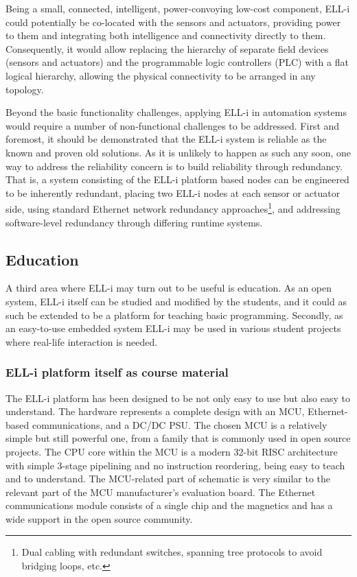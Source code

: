 \documentclass{siamltex}
\begin{document}
Being a small, connected, intelligent, power-convoying low-cost
component, ELL-i could
potentially be co-located with the sensors and actuators, providing
power to them and integrating both intelligence and connectivity
directly to them.  Consequently, it would allow replacing the
hierarchy of separate field devices (sensors and actuators) and the
programmable logic controllers (PLC) with a flat logical hierarchy,
allowing the physical connectivity to be arranged in any topology.

Beyond the basic functionality challenges, applying ELL-i in
automation systems would require a number of non-functional challenges
to be addressed.  First and foremost, it should be demonstrated that
the ELL-i system is reliable as the known and proven old solutions.
As it is unlikely to happen as such any soon, one way to address the
reliability concern is to build reliability through redundancy.  That
is, a system consisting of the ELL-i platform based nodes can be
engineered to be inherently redundant, placing two ELL-i nodes at each
sensor or actuator side, using standard Ethernet network redundancy
approaches\footnote{Dual cabling with redundant switches, spanning
  tree protocols to avoid bridging loops, etc.}, and addressing
software-level redundancy through differing runtime systems.

\subsection{Education}

A third area where ELL-i may turn out to be useful is education.  As
an open system, ELL-i itself can be studied and modified by the
students, and it could as such be extended to be a platform for teaching
basic programming.  Secondly, as an easy-to-use embedded system ELL-i
may be used in various student projects where real-life interaction is
needed.

\subsubsection{ELL-i platform itself as course material}

The ELL-i platform has been designed to be not only easy to use but
also easy to understand.  The hardware represents a complete design
with an MCU, Ethernet-based communications, and a DC/DC PSU.  The
chosen MCU is a relatively simple but still powerful one, from a
family that is commonly used in open source projects.  The CPU core
within the MCU is a modern 32-bit RISC architecture with simple
3-stage pipelining and no instruction reordering, being easy to teach
and to understand.  The MCU-related part of schematic is very similar
to the relevant part of the MCU manufacturer's evaluation board.  The
Ethernet communications module consists of a single chip and the
magnetics and has a wide support in the open source community.
\end{document}
